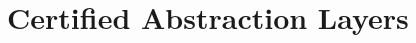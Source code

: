 \documentclass[acmsmall,screen,review,anonymous]{acmart}
\newcommand{\kw}[1]{\ensuremath{ \mathsf{#1} }}
\newcommand{\Clight}{\ensuremath{ \mathsf{Clight} }}
\begin{document}







\section{Certified Abstraction Layers} \label{app:cal} %
\end{document}
